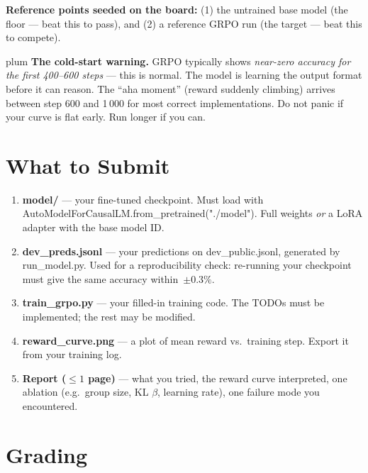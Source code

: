 \documentclass[11pt]{article}
\newcommand{\codesm}[1]{{\ttfamily\footnotesize #1}}
\begin{document}
\textbf{Reference points seeded on the board:} (1) the untrained base model (the floor --- beat this to pass), and (2) a reference GRPO run (the target --- beat this to compete).

\begin{qbox}{plum}
\textbf{The cold-start warning.}
GRPO typically shows \emph{near-zero accuracy for the first 400--600 steps} --- this is normal.
The model is learning the output format before it can reason.
The ``aha moment'' (reward suddenly climbing) arrives between step 600 and 1\,000 for most correct implementations.
Do not panic if your curve is flat early.
Run longer if you can.
\end{qbox}

\section{What to Submit}

\begin{deliver}
\begin{enumerate}[leftmargin=1.5em, itemsep=3pt]
  \item \textbf{\codesm{model/}} --- your fine-tuned checkpoint.
        Must load with \codesm{AutoModelForCausalLM.from\_pretrained("./model")}.
        Full weights \emph{or} a LoRA adapter with the base model ID.
  \item \textbf{\codesm{dev\_preds.jsonl}} --- your predictions on \codesm{dev\_public.jsonl},
        generated by \codesm{run\_model.py}. Used for a reproducibility check:
        re-running your checkpoint must give the same accuracy within~$\pm 0.3\%$.
  \item \textbf{\codesm{train\_grpo.py}} --- your filled-in training code.
        The TODOs must be implemented; the rest may be modified.
  \item \textbf{\codesm{reward\_curve.png}} --- a plot of mean reward vs.\ training step.
        Export it from your training log.
  \item \textbf{Report ($\leq 1$ page)} --- what you tried, the reward curve interpreted,
        one ablation (e.g.\ group size, KL $\beta$, learning rate), one failure mode you encountered.
\end{enumerate}
\end{deliver}

\section{Grading}
\end{document}
